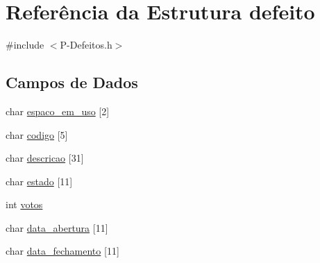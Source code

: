 \hypertarget{structdefeito}{\section{Referência da Estrutura defeito}
\label{structdefeito}
}


{\ttfamily \#include $<$P-\/\-Defeitos.\-h$>$}

\subsection*{Campos de Dados}
\begin{DoxyCompactItemize}
\item 
char \hyperlink{structdefeito_ac7e43414b526549a2b1e10ea21cf75de}{espaco\-\_\-em\-\_\-uso} \mbox{[}2\mbox{]}
\item 
char \hyperlink{structdefeito_ad0c9d37982e1e28e99d46e4b61873b2b}{codigo} \mbox{[}5\mbox{]}
\item 
char \hyperlink{structdefeito_ab8a653279ecd1a1fc475747d6091f7c2}{descricao} \mbox{[}31\mbox{]}
\item 
char \hyperlink{structdefeito_a4365c78a9264f318b8bc48995318ef85}{estado} \mbox{[}11\mbox{]}
\item 
int \hyperlink{structdefeito_a919763f0f66461a8344b645bc82bd54c}{votos}
\item 
char \hyperlink{structdefeito_a1e14caafacbe2dfe7ab9da5e758a4c53}{data\-\_\-abertura} \mbox{[}11\mbox{]}
\item 
char \hyperlink{structdefeito_a1706fa61f6fe2a1bc5c18ed4c787edf3}{data\-\_\-fechamento} \mbox{[}11\mbox{]}
\end{DoxyCompactItemize}


